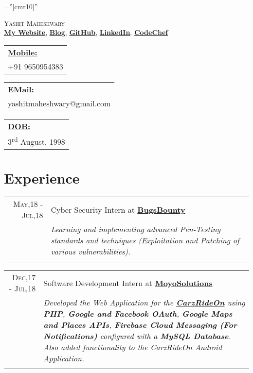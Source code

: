 \documentclass[a4paper,10pt]{article}
\begin{document}
\pagestyle{empty}

\font\fb=''[cmr10]''

\par{\centering
		{\Huge \textsc{Yashit Maheshwary}\\
		}
		\href{https://yashitm.tech/}{\textbf{My Website}}, \href{https://medium.com/@yashitmaheshwary}{\textbf{Blog}}, \href{https://www.github.com/YashitM}{\textbf{GitHub}}, \href{https://www.linkedin.com/in/yashit-maheshwary-aa8078b2/}{\textbf{LinkedIn}}, \href{https://www.codechef.com/users/yashitm}{\textbf{CodeChef}}
	\par}
\begin{tabular}[t]{@{}l} 
    \underline{\textbf{Mobile:}}\\  +91 9650954383
\end{tabular}
\hfill
\begin{tabular}[t]{l@{}}
    \underline{\textbf{EMail:}}\\ yashitmaheshwary@gmail.com
\end{tabular}
\hfill
\begin{tabular}[t]{l@{}}
    \underline{\textbf{DOB:}}\\ 3\textsuperscript{rd} August, 1998
\end{tabular}

\section{Experience}
\begin{tabular}{r|p{14cm}}
\textsc{May,18 - Jul,18} & Cyber Security Intern at \href{https://bugsbounty.io/}{\textbf{BugsBounty}}\\
& \emph{\small{Learning and implementing advanced Pen-Testing standards and techniques (Exploitation
and Patching of various vulnerabilities).}}\\\multicolumn{2}{c}{}
\end{tabular}
\begin{tabular}{r|p{14cm}}
\textsc{Dec,17 - Jul,18} & Software Development Intern at \href{http://www.moyosolutions.online}{\textbf{MoyoSolutions}}\\
& \emph{\small{Developed the Web Application for the \href{https://www.carzrideon.com/}{\textbf{CarzRideOn}} using \textbf{PHP}, \textbf{Google and Facebook OAuth}, \textbf{Google Maps and Places APIs}, \textbf{Firebase Cloud Messaging (For Notifications)} configured with a \textbf{MySQL Database}. Also added functionality to the CarzRideOn Android Application.}}\\\multicolumn{2}{c}{}
\end{tabular}
\end{document}

